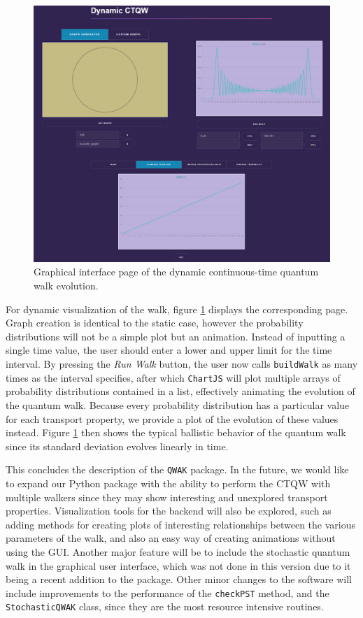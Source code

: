 \documentclass[../../dissertation.tex]{subfiles}
\begin{document}
\begin{figure}[!h]
  \centering
  \includegraphics[scale=0.4]{img/QWAK/qwakGuiDynamicQW.png}
  \caption{Graphical interface page of the dynamic continuous-time quantum walk evolution.}
  \label{fig:guiDynamicPage}
\end{figure}

For dynamic visualization of the walk, figure \ref{fig:guiDynamicPage} displays
the corresponding page. Graph creation is identical to the static case, however
the probability distributions will not be a simple plot but an animation.
Instead of inputting a single time value, the user should enter a lower and
upper limit for the time interval. By pressing the \textit{Run Walk} button,
the user now calls \texttt{buildWalk} as many times as the interval specifies,
after which \texttt{ChartJS} will plot multiple arrays of probability
distributions contained in a list, effectively animating the evolution of the
quantum walk. Because every probability distribution has a particular value for
each transport property, we provide a plot of the evolution of these
values instead. Figure \ref{fig:guiDynamicPage} then shows the typical ballistic
behavior of the quantum walk since its standard deviation evolves linearly in
time. 

This concludes the description of the \texttt{QWAK} package. In the future, we
would like to expand our Python package with the ability to perform the CTQW
with multiple walkers since they may show interesting and unexplored transport
properties. Visualization tools for the backend will also be explored, such as
adding methods for creating plots of interesting relationships between the
various parameters of the walk, and also an easy way of creating animations
without using the GUI. Another major feature will be to include the stochastic
quantum walk in the graphical user interface, which was not done in this
version due to it being a recent addition to the package. Other minor changes
to the software will include improvements to the performance of the \texttt{checkPST}
method, and the \texttt{StochasticQWAK} class, since they are the most resource
intensive routines. 
\end{document}

